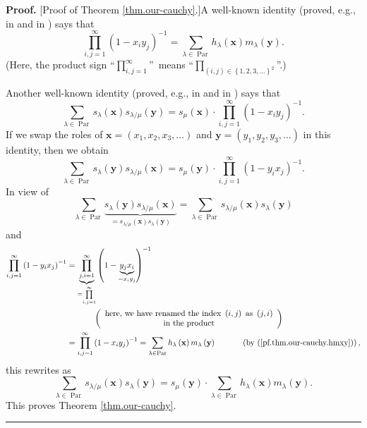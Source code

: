 \documentclass[numbers=enddot,12pt,final,onecolumn,notitlepage]{scrartcl}%
\theoremstyle{definition}
\newenvironment{proof}[1][Proof]{\noindent\textbf{#1.} }{\ \rule{0.5em}{0.5em}}
\let\sumnonlimits\sum
\let\prodnonlimits\prod
\renewcommand{\sum}{\sumnonlimits\limits}
\renewcommand{\prod}{\prodnonlimits\limits}
\begin{document}
\begin{proof}
[Proof of Theorem \ref{thm.our-cauchy}.]A well-known identity (proved, e.g.,
in \cite[Chapter I, (4.2)]{Macdon95} and in \cite[proof of Proposition
2.5.15]{GriRei}) says that%
\begin{equation}
\prod_{i,j=1}^{\infty}\left(  1-x_{i}y_{j}\right)  ^{-1}=\sum_{\lambda
\in\operatorname*{Par}}h_{\lambda}\left(  \mathbf{x}\right)  m_{\lambda
}\left(  \mathbf{y}\right)  . \label{pf.thm.our-cauchy.hmxy}%
\end{equation}
(Here, the product sign \textquotedblleft$\prod_{i,j=1}^{\infty}%
$\textquotedblright\ means \textquotedblleft$\prod_{\left(  i,j\right)
\in\left\{  1,2,3,\ldots\right\}  ^{2}}$\textquotedblright.)

Another well-known identity (proved, e.g., in \cite[\S I.5, example
26]{Macdon95} and in \cite[Exercise 2.5.11(a)]{GriRei}) says that%
\[
\sum_{\lambda\in\operatorname*{Par}}s_{\lambda}\left(  \mathbf{x}\right)
s_{\lambda/\mu}\left(  \mathbf{y}\right)  =s_{\mu}\left(  \mathbf{x}\right)
\cdot\prod_{i,j=1}^{\infty}\left(  1-x_{i}y_{j}\right)  ^{-1}.
\]
If we swap the roles of $\mathbf{x}=\left(  x_{1},x_{2},x_{3},\ldots\right)  $
and $\mathbf{y}=\left(  y_{1},y_{2},y_{3},\ldots\right)  $ in this identity,
then we obtain%
\[
\sum_{\lambda\in\operatorname*{Par}}s_{\lambda}\left(  \mathbf{y}\right)
s_{\lambda/\mu}\left(  \mathbf{x}\right)  =s_{\mu}\left(  \mathbf{y}\right)
\cdot\prod_{i,j=1}^{\infty}\left(  1-y_{i}x_{j}\right)  ^{-1}.
\]
In view of%
\[
\sum_{\lambda\in\operatorname*{Par}}\underbrace{s_{\lambda}\left(
\mathbf{y}\right)  s_{\lambda/\mu}\left(  \mathbf{x}\right)  }_{=s_{\lambda
/\mu}\left(  \mathbf{x}\right)  s_{\lambda}\left(  \mathbf{y}\right)  }%
=\sum_{\lambda\in\operatorname*{Par}}s_{\lambda/\mu}\left(  \mathbf{x}\right)
s_{\lambda}\left(  \mathbf{y}\right)
\]
and
\begin{align*}
\prod_{i,j=1}^{\infty}\left(  1-y_{i}x_{j}\right)  ^{-1}  &
=\underbrace{\prod_{j,i=1}^{\infty}}_{=\prod_{i,j=1}^{\infty}}\left(
1-\underbrace{y_{j}x_{i}}_{=x_{i}y_{j}}\right)  ^{-1}\\
&  \ \ \ \ \ \ \ \ \ \ \left(
\begin{array}
[c]{c}%
\text{here, we have renamed the index }\left(  i,j\right)  \text{ as }\left(
j,i\right) \\
\text{in the product}%
\end{array}
\right) \\
&  =\prod_{i,j=1}^{\infty}\left(  1-x_{i}y_{j}\right)  ^{-1}=\sum_{\lambda
\in\operatorname*{Par}}h_{\lambda}\left(  \mathbf{x}\right)  m_{\lambda
}\left(  \mathbf{y}\right)  \ \ \ \ \ \ \ \ \ \ \left(  \text{by
(\ref{pf.thm.our-cauchy.hmxy})}\right)  ,
\end{align*}
this rewrites as%
\[
\sum_{\lambda\in\operatorname*{Par}}s_{\lambda/\mu}\left(  \mathbf{x}\right)
s_{\lambda}\left(  \mathbf{y}\right)  =s_{\mu}\left(  \mathbf{y}\right)
\cdot\sum_{\lambda\in\operatorname*{Par}}h_{\lambda}\left(  \mathbf{x}\right)
m_{\lambda}\left(  \mathbf{y}\right)  .
\]
This proves Theorem \ref{thm.our-cauchy}.
\end{proof}
\end{document}
